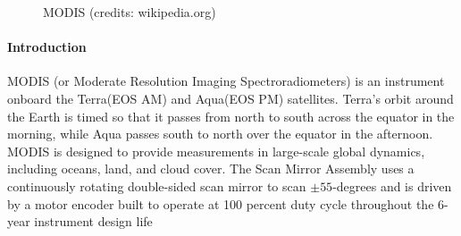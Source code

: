 \begin{figure}[H]
    \quad
    \caption{MODIS (credits: wikipedia.org)}
\end{figure}
\paragraph{Introduction}
MODIS (or Moderate Resolution Imaging Spectroradiometers) is an instrument onboard the Terra(EOS AM)
and Aqua(EOS PM) satellites. Terra's orbit around the Earth is timed so that it passes from north to south
across the equator in the morning, while Aqua passes south to north over the equator in the afternoon. MODIS
is designed to provide measurements in large-scale global dynamics, including oceans, land, and cloud cover.
The Scan Mirror Assembly uses a continuously rotating double-sided scan mirror to scan $\pm55$-degrees and is
driven by a motor encoder built to operate at 100 percent duty cycle throughout the 6-year instrument design
life

